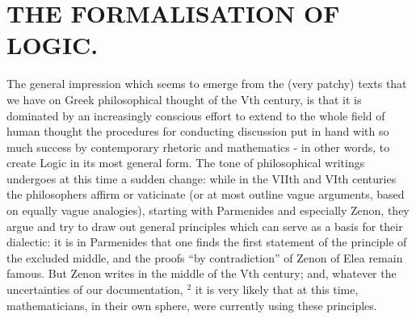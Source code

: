 \section*{THE FORMALISATION OF LOGIC.}
{}

The general impression which seems to emerge from the (very patchy) texts that we have on Greek philosophical thought of the Vth century, is that it is dominated by an increasingly conscious effort to extend to the whole field of human thought the procedures for conducting discussion put in hand with so much success by contemporary rhetoric and mathematics - in other words, to create Logic in its most general form. The tone of philosophical writings undergoes at this time a sudden change: while in the VIIth and VIth centuries the philosophers affirm or vaticinate (or at most outline vague arguments, based on equally vague analogies), starting with Parmenides and especially Zenon, they argue and try to draw out general principles which can serve as a basis for their dialectic: it is in Parmenides that one finds the first statement of the principle of the excluded middle, and the proofs ``by contradiction'' of Zenon of Elea remain famous. But Zenon writes in the middle of the Vth century; and, whatever the uncertainties of our documentation, \(^{2}\) it is very likely that at this time, mathematicians, in their own sphere, were currently using these principles.

